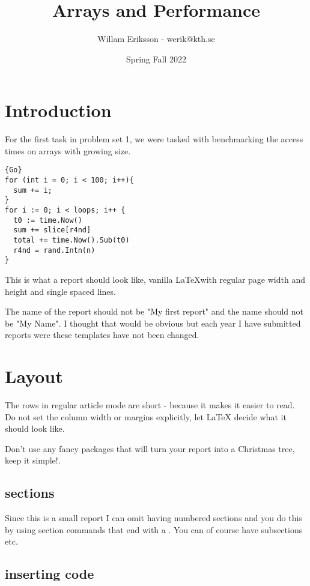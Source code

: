 \documentclass[a4paper,11pt]{article}
\begin{document}
\title{
    \textbf{Arrays and Performance}
}
\author{Willam Eriksson - werik@kth.se}
\date{Spring Fall 2022}

\maketitle

\section*{Introduction}
For the first task in problem set 1, we were tasked with benchmarking the access times on 
arrays with growing size. 

\begin{lstlisting}{Go}
for (int i = 0; i < 100; i++){
  sum += i;
}
for i := 0; i < loops; i++ {
  t0 := time.Now()
  sum += slice[r4nd]
  total += time.Now().Sub(t0)
  r4nd = rand.Intn(n)
}
\end{lstlisting}

This is what a report should look like, vanilla \LaTeX with regular
page width and height and single spaced lines. 

The name of the report should not be "My first report" and the name
should not be "My Name". I thought that would be obvious but each year
I have submitted reports were these templates have not been changed. 

\section*{Layout}

The rows in regular article mode are short - because it makes it
easier to read. Do not set the column width or margins explicitly, let
LaTeX decide what it should look like.

Don't use any fancy packages that will turn your report into a
Christmas tree, keep it simple!.

\subsection*{sections}

Since this is a small report I can omit having numbered sections and
you do this by using section commands that end with a {\tt *}. You can
of course have subsections etc. 


\subsection*{inserting code}
\end{document}
